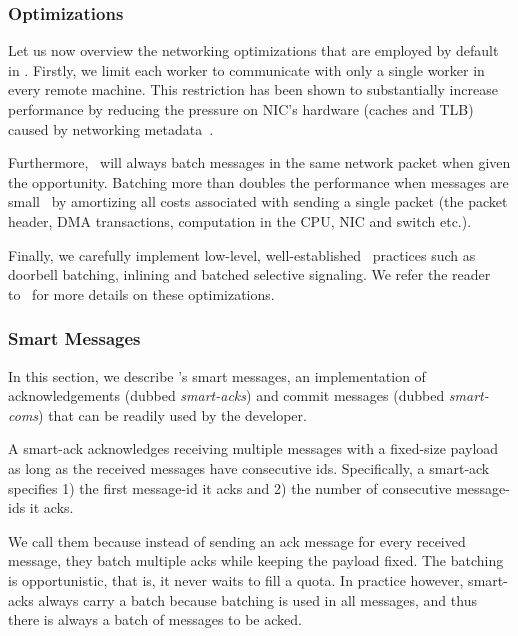 \subsubsection{Optimizations} \label{sec:nw:opt}

Let us now overview the networking optimizations that are employed by default in \odlib.
Firstly, we limit each worker to communicate with only a single worker in every remote machine. 
This restriction has been shown to substantially increase performance by reducing the pressure on NIC's hardware (caches and TLB) caused by networking metadata~\cite{A&V:2018}.

Furthermore, \odlib\ will always batch messages in the same network packet when given the opportunity. Batching more than doubles the performance when messages are small~\cite{A&V:2018} by amortizing all costs associated with sending a single packet (\ie the packet header, DMA transactions, computation in the CPU, NIC and switch etc.).

Finally, we carefully implement low-level, well-established \RDMA~practices such as doorbell batching, inlining and batched selective signaling. We refer the reader to~\cite{Barak:2013, Kalia:2016} for more details on these optimizations.

\subsubsection{Smart Messages}\label{sec:nw:sm}

In this section, we describe \odlib's smart messages, \ie an implementation of acknowledgements (dubbed \emph{smart-acks}) and commit messages (dubbed \emph{smart-coms}) that can be readily used by the developer. 

A smart-ack acknowledges receiving multiple messages with a fixed-size payload as long as the received messages have consecutive ids.
Specifically, a smart-ack specifies 1) the first message-id it acks and 2) the number of consecutive message-ids it acks.

We call them  because instead of sending an ack message for every received message, they batch multiple acks while keeping the payload fixed.  The batching is opportunistic, that is, it never waits to fill a quota. In practice however, smart-acks always carry a batch because batching is used in all messages, and thus there is always a batch of messages to be acked. 

